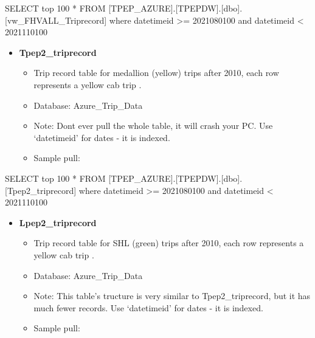 \documentclass[
]{book}
\newenvironment{Shaded}{\begin{snugshade}}{\end{snugshade}}
\newcommand{\DecValTok}[1]{\textcolor[rgb]{0.00,0.00,0.81}{#1}}
\newcommand{\NormalTok}[1]{#1}
\newcommand{\SpecialCharTok}[1]{\textcolor[rgb]{0.00,0.00,0.00}{#1}}
\providecommand{\tightlist}{%
  \setlength{\itemsep}{0pt}\setlength{\parskip}{0pt}}
\begin{document}
\begin{Shaded}
\begin{Highlighting}[]
\NormalTok{SELECT top }\DecValTok{100} \SpecialCharTok{*}
\NormalTok{  FROM [TPEP\_AZURE].[TPEPDW].[dbo].[vw\_FHVALL\_Triprecord]}
\NormalTok{  where datetimeid }\SpecialCharTok{\textgreater{}=} \DecValTok{2021080100}\NormalTok{ and datetimeid }\SpecialCharTok{\textless{}} \DecValTok{2021110100}
\end{Highlighting}
\end{Shaded}

\begin{itemize}
\tightlist
\item
  \textbf{Tpep2\_triprecord}

  \begin{itemize}
  \tightlist
  \item
    Trip record table for medallion (yellow) trips after 2010, each row represents a yellow cab trip .
  \item
    Database: Azure\_Trip\_Data
  \item
    Note: Dont ever pull the whole table, it will crash your PC. Use `datetimeid' for dates - it is indexed.
  \item
    Sample pull:
  \end{itemize}
\end{itemize}

\begin{Shaded}
\begin{Highlighting}[]
\NormalTok{SELECT top }\DecValTok{100} \SpecialCharTok{*}
\NormalTok{  FROM [TPEP\_AZURE].[TPEPDW].[dbo].[Tpep2\_triprecord]}
\NormalTok{  where datetimeid }\SpecialCharTok{\textgreater{}=} \DecValTok{2021080100}\NormalTok{ and datetimeid }\SpecialCharTok{\textless{}} \DecValTok{2021110100}
\end{Highlighting}
\end{Shaded}

\begin{itemize}
\tightlist
\item
  \textbf{Lpep2\_triprecord}

  \begin{itemize}
  \tightlist
  \item
    Trip record table for SHL (green) trips after 2010, each row represents a yellow cab trip .
  \item
    Database: Azure\_Trip\_Data
  \item
    Note: This table's tructure is very similar to Tpep2\_triprecord, but it has much fewer records. Use `datetimeid' for dates - it is indexed.
  \item
    Sample pull:
  \end{itemize}
\end{itemize}
\end{document}
